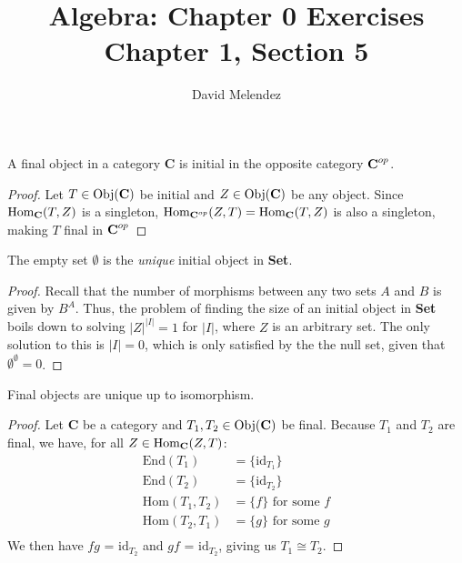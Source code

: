 \documentclass[12pt]{article}
\newenvironment{problem}[2][Problem]{\begin{trivlist}
\item[\hskip \labelsep {\bfseries #1}\hskip \labelsep {\bfseries #2.}]}{\end{trivlist}}
\newcommand{\catname}[1]{\normalfont\textbf{#1}}
\newcommand{\Hom}{\text{Hom}}
\newcommand{\Homc}[2]{\Hom_{\catname{#1}}(#2)}
\newcommand{\Objc}[1]{\text{Obj}(\catname{C})}
\newcommand{\End}{\text{End}}
\newcommand{\id}{\text{id}}
\begin{document}
\title{Algebra: Chapter 0 Exercises\\ \large Chapter 1, Section 5}
\author{David Melendez}
\maketitle

\begin{problem}{5.1}
  A final object in a category \catname{C} is initial in the opposite category $\catname{C}^{op}$.
\end{problem}
\begin{proof}
  Let $T \in \Objc{C}$ be initial and $Z \in \Objc{C}$ be any object. 
  Since $\Homc{C}{T, Z}$ is a singleton, 
  $\Hom_{\catname{C}^{op}}(Z, T) = \Homc{C}{T, Z}$ 
  is also a singleton, making $T$ final in $\catname{C}^{op}$
\end{proof}

\begin{problem}{5.2}
  The empty set $\emptyset$ is the \textit{unique} initial object in \catname{Set}.
\end{problem}
\begin{proof}
  Recall that the number of morphisms between any two sets $A$ and $B$ is given by $B^A$. 
  Thus, the problem of finding the size of an initial object in \catname{Set} boils down to solving $|Z|^{|I|}=1$ for $|I|$, where $Z$ is an arbitrary set.
  The only solution to this is $|I|=0$, which is only satisfied by the the null set, given that $\emptyset^\emptyset = 0$.
\end{proof}

\begin{problem}{5.3}
  Final objects are unique up to isomorphism.
\end{problem}
\begin{proof}
  Let \catname{C} be a category and $T_1, T_2\in \Objc{C}$ be final. Because $T_1$ and $T_2$ are final, we have, for all $Z\in\Homc{C}{Z, T}$:
  \begin{align*}
    \End(T_1) &= \{\id_{T_1}\}\\
    \End(T_2) &= \{\id_{T_2}\}\\
    \Hom(T_1, T_2) &= \{f\} \text{ for some } f\\
    \Hom(T_2, T_1) &= \{g\} \text{ for some } g\\
  \end{align*}
  We then have $fg$ = $\id_{T_2}$ and $gf$ = $\id_{T_2}$, giving us $T_1 \cong T_2$.
\end{proof}
\end{document}
